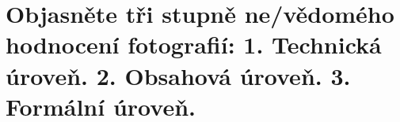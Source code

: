\section{Objasněte tři stupně ne/vědomého hodnocení fotografií: 1. Technická úroveň. 2. Obsahová úroveň. 3. Formální 
úroveň.}